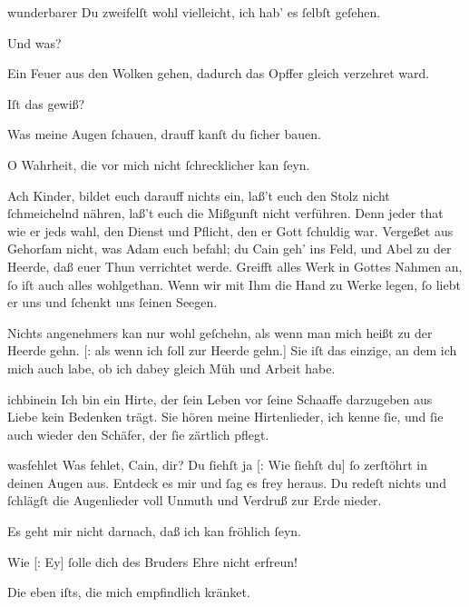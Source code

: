 \documentclass[tocstyle=ref-genre]{ees}
\begin{document}
{\begin{movement}{wunderbarer}
  \voice[Eva]
  Du zweifelſt wohl vielleicht, ich hab’ es ſelbſt geſehen.

  \voice[Cain]
  Und was?

  \voice[Eva]
  Ein Feuer aus den Wolken gehen,
  dadurch das Opffer gleich verzehret ward.

  \voice[Cain]
  Iſt das gewiß?

  \voice[Eva]
  Was meine Augen ſchauen,
  drauff kanſt du ſicher bauen.

  \voice[Cain]
  O Wahrheit, die vor mich nicht ſchrecklicher kan ſeyn.

  \voice[Eva]
  Ach Kinder, bildet euch darauff nichts ein,
  laß’t euch den Stolz nicht ſchmeichelnd nähren,
  laß’t euch die Mißgunſt nicht verführen.
  Denn jeder that wie er jeds wahl,
  den Dienst und Pflicht,
  den er Gott ſchuldig war. Vergeßet aus Gehorſam nicht,
  was Adam euch befahl;
  du Cain geh’ ins Feld, und Abel zu der Heerde,
  daß euer Thun verrichtet werde.
  Greifft alles Werk in Gottes Nahmen an,
  ſo iſt auch alles wohlgethan.
  Wenn wir mit Ihm die Hand zu Werke legen,
  ſo liebt er uns und ſchenkt uns ſeinen Seegen.

  \voice[Abel]
  Nichts angenehmers kan nur wohl geſchehn,
  als wenn man mich heißt zu der Heerde gehn.
  [: als wenn ich ſoll zur Heerde gehn.]
  Sie iſt das einzige, an dem ich mich auch labe,
  ob ich dabey gleich Müh und Arbeit habe.
\end{movement}

\begin{movement}{ichbinein}
  \voice[Abel]
  Ich bin ein Hirte, der ſein Leben
  vor ſeine Schaaffe darzugeben
  aus Liebe kein Bedenken trägt.
  Sie hören meine Hirtenlieder,
  ich kenne ſie, und ſie auch wieder
  den Schäfer, der ſie zärtlich pflegt.
\end{movement}

\begin{movement}{wasfehlet}
  \voice[Eva]
  Was fehlet, Cain, dir?
  Du ſiehſt ja [: Wie ſiehſt du] ſo zerſtöhrt in deinen Augen aus.
  Entdeck es mir
  und ſag es frey heraus.
  Du redeſt nichts und ſchlägſt die Augenlieder
  voll Unmuth und Verdruß zur Erde nieder.

  \voice[Cain]
  Es geht mir nicht darnach, daß ich kan fröhlich ſeyn.

  \voice[Eva]
  Wie [: Ey] ſolle dich des Bruders Ehre nicht erfreun!

  \voice[Cain]
  Die eben iſts, die mich empfindlich kränket.


\end{movement}}
\end{document}
